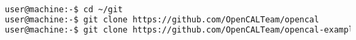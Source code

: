 \begin{lstlisting}[numbers=none,language=bash]
user@machine:-$ cd ~/git
user@machine:-$ git clone https://github.com/OpenCALTeam/opencal
user@machine:-$ git clone https://github.com/OpenCALTeam/opencal-examples
\end{lstlisting}






